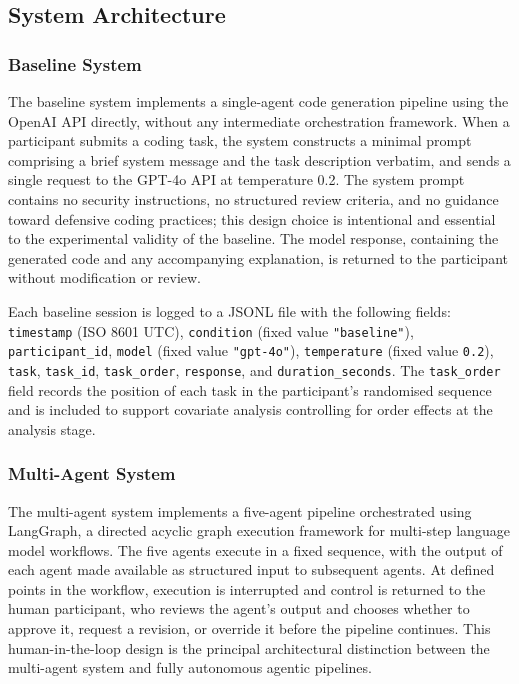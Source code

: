 \subsection{System Architecture}

\subsubsection*{Baseline System}

The baseline system implements a single-agent code generation pipeline using the OpenAI API directly, without any intermediate orchestration framework. When a participant submits a coding task, the system constructs a minimal prompt comprising a brief system message and the task description verbatim, and sends a single request to the GPT-4o API at temperature 0.2. The system prompt contains no security instructions, no structured review criteria, and no guidance toward defensive coding practices; this design choice is intentional and essential to the experimental validity of the baseline. The model response, containing the generated code and any accompanying explanation, is returned to the participant without modification or review.

Each baseline session is logged to a JSONL file with the following fields: \texttt{timestamp} (ISO 8601 UTC), \texttt{condition} (fixed value \texttt{"baseline"}), \texttt{participant\_id}, \texttt{model} (fixed value \texttt{"gpt-4o"}), \texttt{temperature} (fixed value \texttt{0.2}), \texttt{task}, \texttt{task\_id}, \texttt{task\_order}, \texttt{response}, and \texttt{duration\_seconds}. The \texttt{task\_order} field records the position of each task in the participant's randomised sequence and is included to support covariate analysis controlling for order effects at the analysis stage.

\subsubsection*{Multi-Agent System}

The multi-agent system implements a five-agent pipeline orchestrated using LangGraph, a directed acyclic graph execution framework for multi-step language model workflows. The five agents execute in a fixed sequence, with the output of each agent made available as structured input to subsequent agents. At defined points in the workflow, execution is interrupted and control is returned to the human participant, who reviews the agent's output and chooses whether to approve it, request a revision, or override it before the pipeline continues. This human-in-the-loop design is the principal architectural distinction between the multi-agent system and fully autonomous agentic pipelines.

